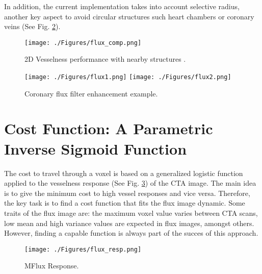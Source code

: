 In addition, the current implementation takes into account selective radius, another key aspect to avoid circular structures such heart chambers or coronary veins (See Fig. \ref{fig:fl1_vs_fl2}).
\begin{figure}[ht]
	\centering
		\texttt{[image: ./Figures/flux\_comp.png]}
	\caption[Vesselness Comparison]{2D Vesselness performance with nearby structures \citep{Lesage2009Thesis}.}
	\label{fig:fl_comp}
\end{figure}

\begin{figure}[ht]
	\centering
		\texttt{[image: ./Figures/flux1.png]}
		\texttt{[image: ./Figures/flux2.png]}
	\caption[Coronary Flux Filter Enhancement]{Coronary flux filter enhancement example.}
	\label{fig:fl1_vs_fl2}
\end{figure}

\section{Cost Function: A Parametric Inverse Sigmoid Function}\label{cent:cost}

The cost to travel through a voxel is based on a generalized logistic function applied to the vesselness response (See Fig. \ref{fig:flux_resp}) of the CTA image. The main idea is to give the minimum cost to high vessel responses and vice versa. Therefore, the key task is to find a cost function that fits the flux image dynamic. Some traits of the flux image are: the maximum voxel value varies between CTA scans, low mean and high variance values are expected in flux images, amongst others. However, finding a capable function is always part of the succes of this approach.

\begin{figure}[ht]
	\centering
		\texttt{[image: ./Figures/flux\_resp.png]}
	\caption[MFlux Response]{MFlux Response.}
	\label{fig:flux_resp}
\end{figure}

